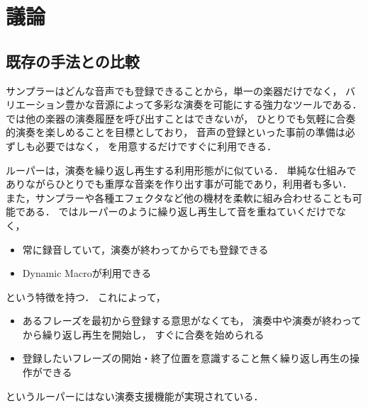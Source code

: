 \section{議論}


\subsection{既存の手法との比較}
サンプラーはどんな音声でも登録できることから，単一の楽器だけでなく，
バリエーション豊かな音源によって多彩な演奏を可能にする強力なツールである．
{\system}では他の楽器の演奏履歴を呼び出すことはできないが，
ひとりでも気軽に合奏的演奏を楽しめることを目標としており，
音声の登録といった事前の準備は必ずしも必要ではなく，
{\system}を用意するだけですぐに利用できる．

ルーパーは，演奏を繰り返し再生する利用形態が{\system}に似ている．
単純な仕組みでありながらひとりでも重厚な音楽を作り出す事が可能であり，利用者も多い．
また，サンプラーや各種エフェクタなど他の機材を柔軟に組み合わせることも可能である．
{\system}ではルーパーのように繰り返し再生して音を重ねていくだけでなく，
\begin{itemize}
\item 常に録音していて，演奏が終わってからでも登録できる
\item Dynamic Macroが利用できる
\end{itemize}
という特徴を持つ．
これによって，
\begin{itemize}
\item あるフレーズを最初から登録する意思がなくても，
  演奏中や演奏が終わってから繰り返し再生を開始し，
  すぐに合奏を始められる
\item 登録したいフレーズの開始・終了位置を意識すること無く繰り返し再生の操作ができる
\end{itemize}
というルーパーにはない演奏支援機能が実現されている．





